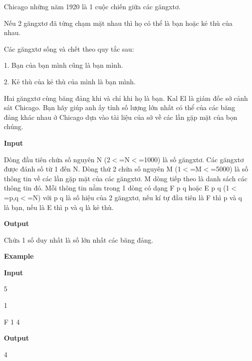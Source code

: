



    Chicago những năm 1920 là 1 cuộc chiến giữa các găngxtơ.   

      Nếu 2 găngxtơ đã từng chạm mặt nhau thì họ có thể là bạn hoặc kẻ thù của nhau.     

      Các găngxtơ sống và chết theo quy tắc sau:     

      1. Bạn của bạn mình cũng là bạn mình.     

      2. Kẻ thù của kẻ thù của mình là bạn mình.     

      Hai găngxtơ cùng băng đảng khi và chỉ khi họ là bạn. Kal El là giám đốc sở cảnh sát Chicago. Bạn hãy giúp anh ấy tính số lượng lớn nhất có thể của các băng đảng khác nhau ở Chicago dựa vào tài liệu của sở về các lần gặp mặt của bọn chúng.     

\textbf{       Input      }

      Dòng đầu tiên chứa số nguyên N (2$<$=N$<$=1000) là số găngxtơ. Các găngxtơ được đánh số từ 1 đến N. Dòng thứ 2 chứa số nguyên M (1$<$=M$<$=5000) là số thông tin về các lần gặp mặt của các găngxtơ. M dòng tiếp theo là danh sách các thông tin đó. Mỗi thông tin nằm trong 1 dòng có dạng F p q hoặc E p q (1$<$=p,q$<$=N) với p q là số hiệu của 2 găngxtơ, nếu kí tự đầu tiên là F thì p và q là bạn, nếu là E thì p và q là kẻ thù.     

\textbf{       Output      }

      Chứa 1 số duy nhất là số lớn nhất các băng đảng.     

\textbf{       Example      }

\textbf{       Input      }

      5     

      1     

      F 1 4     

\textbf{       Output      }

      4      
\\